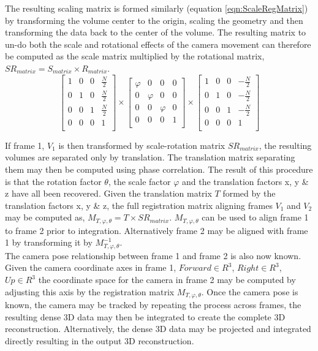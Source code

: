 The resulting scaling matrix is formed similarly (equation \ref{eqn:ScaleRegMatrix}) by transforming the volume center to the origin, scaling the geometry and then transforming the data back to the center of the volume. The resulting matrix to un-do both the scale and rotational effects of the camera movement can therefore be computed as the scale matrix multiplied by the rotational matrix, $SR_{matrix} = S_{matrix} \times R_{matrix}$. \\

\begin{equation} \label{eqn:ScaleRegMatrix}
\left[
\begin{array}{cccc}
1 & 0 & 0 & \frac{N}{2} \\
0 & 1 & 0 & \frac{N}{2} \\
0 & 0 & 1 & \frac{N}{2} \\
0 & 0 & 0 & 1 \\
\end{array}
\right] \times
\left[
\begin{array}{cccc}
\varphi & 0 & 0 & 0 \\
0 & \varphi & 0 & 0 \\
0 & 0 & \varphi & 0 \\
0 & 0 & 0 & 1 \\
\end{array}
\right] \times
\left[
\begin{array}{cccc}
1 & 0 & 0 & -\frac{N}{2} \\
0 & 1 & 0 & -\frac{N}{2} \\
0 & 0 & 1 & -\frac{N}{2} \\
0 & 0 & 0 & 1 \\
\end{array}
\right]
\end{equation}

If frame 1, $V_1$ is then transformed by scale-rotation matrix $SR_{matrix}$, the resulting volumes are separated only by translation. The translation matrix separating them may then be computed using phase correlation. The result of this procedure is that the rotation factor $\theta$, the scale factor $\varphi$ and the translation factors x, y \& z have all been recovered. Given the translation matrix $T$ formed by the translation factors x, y \& z, the full registration matrix aligning frames $V_1$ and $V_2$ may be computed as, $M_{T,\varphi,\theta} = T \times SR_{matrix}$. $M_{T,\varphi,\theta}$ can be used to align frame 1 to frame 2 prior to integration. Alternatively frame 2 may be aligned with frame 1 by transforming it by $M_{T,\varphi,\theta}^{-1}$. \\

The camera pose relationship between frame 1 and frame 2 is also now known. Given the camera coordinate axes in frame 1, $Forward \in R^3$, $Right \in R^3$, $Up \in R^3$ the coordinate space for the camera in frame 2 may be computed by adjusting this axis by the registration matrix $M_{T,\varphi,\theta}$. Once the camera pose is known, the camera may be tracked by repeating the process across frames, the resulting dense 3D data may then be integrated to create the complete 3D reconstruction. Alternatively, the dense 3D data may be projected and integrated directly resulting in the output 3D reconstruction. \\
